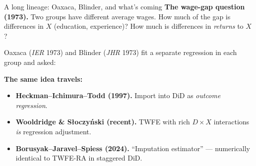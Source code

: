 \documentclass[aspectratio=169,11pt]{beamer}
\begin{document}
\begin{frame}{A long lineage: Oaxaca, Blinder, and what's coming}
\footnotesize
\textbf{The wage-gap question (1973).} \;Two groups have different average wages. \;How much of the gap is differences in $X$ (education, experience)? \;How much is differences in \textit{returns} to $X$?

\vspace{0.5em}
Oaxaca (\textit{IER} 1973) and Blinder (\textit{JHR} 1973) fit a separate regression in each group and asked:

\vspace{0.3em}
\begin{center}
\end{center}

\vspace{0.6em}
\textbf{The same idea travels:}
\begin{itemize}\setlength\itemsep{1pt}\footnotesize
  \item \textbf{Heckman--Ichimura--Todd (1997).} \;Import into DiD as \textit{outcome regression}.
  \item \textbf{Wooldridge \& Słoczyński (recent).} \;TWFE with rich $D \times X$ interactions \textit{is} regression adjustment.
  \item \textbf{Borusyak--Jaravel--Spiess (2024).} \;``Imputation estimator'' --- numerically identical to TWFE-RA in staggered DiD.
\end{itemize}

\vspace{0.4em}
\end{frame}
\end{document}
